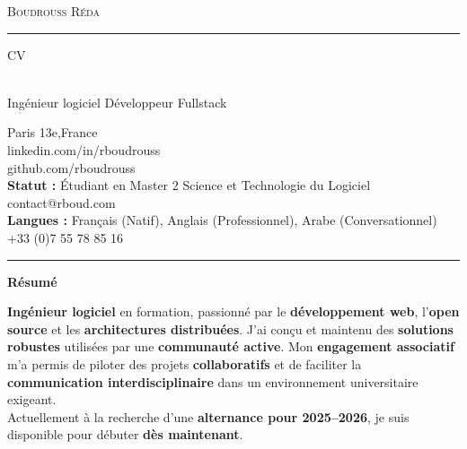 \documentclass[10pt,A4]{article}
\newcommand{\cvsection}[1]
{
	\begin{center}
		\large\textcolor{sectcol}{\textbf{#1}}
	\end{center}
}
\newcommand{\metasection}[2]
{
\footnotesize{#2} \hspace*{\fill} \footnotesize{#1}\\[1pt]
}
\begin{document}
\pagestyle{fancy}	









\vspace{-8pt}
\begin{center}
    {\HUGE \textsc{Boudrouss Réda} \textcolor{sectcol}{\rule[-1mm]{1mm}{0.9cm}} \textsc{CV}}\\[2pt]
    {\small Ingénieur logiciel \textbullet{} Développeur Fullstack}
\end{center}

\vspace{6pt}

\metasection{Paris 13e,France}{}
\metasection{linkedin.com/in/rboudrouss}{}
\metasection{github.com/rboudrouss}{}
\metasection{contact@rboud.com}{\textbf{Statut :} Étudiant en Master 2 Science et Technologie du Logiciel}
\metasection{+33 (0)7 55 78 85 16}{\textbf{Langues :} Français (Natif), Anglais (Professionnel), Arabe (Conversationnel)}

\vspace{-15pt}
\textcolor{softcol}{\hrule}

\normalsize

\cvsection{Résumé}
\textbf{Ingénieur logiciel} en formation, passionné par le \textbf{développement web}, l'\textbf{open source} et les \textbf{architectures distribuées}. J'ai conçu et maintenu des \textbf{solutions robustes} utilisées par une \textbf{communauté active}. Mon \textbf{engagement associatif} m'a permis de piloter des projets \textbf{collaboratifs} et de faciliter la \textbf{communication interdisciplinaire} dans un environnement universitaire exigeant.\\
Actuellement à la recherche d'une \textbf{alternance pour 2025--2026}, je suis disponible pour débuter \textbf{dès maintenant}.
\end{document}
